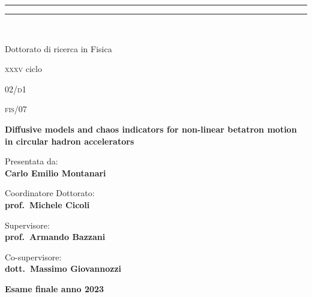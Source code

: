 \begin{titlepage}
\begin{center}
{
{{\Large{\textsc{}}}}} 
{\rule[0.1cm]{\textwidth}{0.1mm}}
{\rule[0.5cm]{\textwidth}{0.6mm}}
\\

\vspace{2em}

\Large{Dottorato di ricerca in Fisica}

\vspace{1ex}

\large{\textsc{xxxv} ciclo}
\end{center}

\vspace{3em}

 02/\textsc{d}1

\vspace{1ex}

 \textsc{fis}/07

\vfill

\begin{center}{
{\LARGE{\bf Diffusive models and chaos indicators for non-linear betatron motion in circular hadron accelerators}\par}
}\end{center}

\vfill %

\noindent
\begin{minipage}{.45\textwidth}
\begin{flushleft}
{\color{uniblack}Presentata da:}\\
\textbf{Carlo Emilio Montanari}
\end{flushleft}
\end{minipage}

\vfill

\noindent
\begin{minipage}[t]{.45\textwidth}
{\color{uniblack}Coordinatore Dottorato:}\\
\textbf{prof.\ Michele Cicoli}
\end{minipage}
\hfill
\begin{minipage}[t]{.45\textwidth}
\begin{flushright}
{\color{uniblack}Supervisore:}\\
\textbf{prof.\ Armando Bazzani}\\

\vspace{1em}

{\color{uniblack}Co-supervisore:}\\
\textbf{dott.\ Massimo Giovannozzi}
\end{flushright}
\end{minipage}

\vfill

\begin{center}
\textbf{Esame finale anno 2023}
\end{center}
\end{titlepage}
